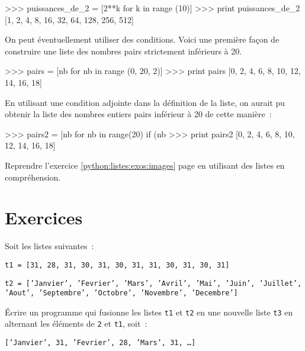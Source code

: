 \begin{pythoncode}
>>> puissances_de_2 = [2**k for k in range (10)]
>>> print puissances_de_2
[1, 2, 4, 8, 16, 32, 64, 128, 256, 512]
\end{pythoncode}


On peut éventuellement utiliser des conditions. Voici une première façon de construire une liste des nombres pairs strictement inférieurs à 20.

\begin{pythoncode}
>>> pairs = [nb for nb in range (0, 20, 2)]
>>> print pairs
[0, 2, 4, 6, 8, 10, 12, 14, 16, 18]
\end{pythoncode}


En utilisant une condition adjointe dans la définition de la liste, on aurait pu obtenir la liste des nombres entiers pairs inférieur à 20  de cette manière~:

\begin{pythoncode}
>>> pairs2 = [nb for nb in range(20) if (nb %
>>> print pairs2
[0, 2, 4, 6, 8, 10, 12, 14, 16, 18]
\end{pythoncode}

\begin{exercice}
Reprendre l'exercice \ref{python:listes:exos:images} page \pageref{python:listes:exos:images}
en utilisant des listes en compréhension.
\end{exercice}

\section{Exercices}

\begin{exercice}
Soit les listes suivantes~:

\texttt{t1 = [31, 28, 31, 30, 31, 30, 31, 31, 30, 31, 30, 31]}

\texttt{t2 = ['Janvier', 'Fevrier', 'Mars', 'Avril', 'Mai', 'Juin', 'Juillet', 'Aout', 'Septembre', 'Octobre', 'Novembre', 'Decembre']}

Écrire un programme qui fusionne les listes \texttt{t1} et \texttt{t2} en une nouvelle liste \texttt{t3} en alternant les éléments de \texttt{2} et \texttt{t1}, soit~:

\texttt{['Janvier', 31, 'Fevrier', 28, 'Mars', 31, \dots]}
\end{exercice}

